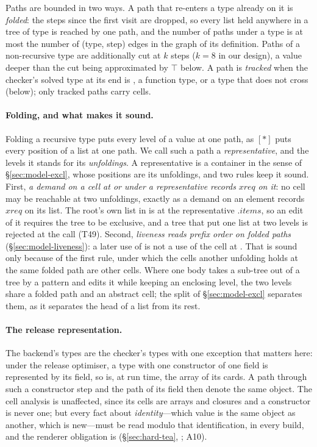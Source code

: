 Paths are bounded in two ways. A path that re-enters a type already on it is \emph{folded}: the steps
since the first visit are dropped, so every list held anywhere in a tree of type
 is reached by one path, and the number of paths under a type
is at most the number of (type, step) edges in the graph of its definition. Paths of a non-recursive
type are additionally cut at $k$ steps ($k = 8$ in our design), a value deeper than the cut being
approximated by $\top$ below. A path is \emph{tracked} when the checker's solved type at its end is
, a function type, or a type that does not cross (below); only tracked paths carry cells.

\paragraph{Folding, and what makes it sound.} Folding a recursive type puts every level of a value at one
path, as $[\ast]$ puts every position of a list at one path. We call such a path a \emph{representative},
and the levels it stands for its \emph{unfoldings}. A representative is a container in the sense of
\S\ref{sec:model-excl}, whose positions are its unfoldings, and two rules keep it sound. First, \emph{a
demand on a cell at or under a representative records} $\mathit{xreq}$ \emph{on it}: no cell may be
reachable at two unfoldings, exactly as a demand on an element records $\mathit{xreq}$ on its list. The
root's own list in  is at the
representative $.\mathit{items}$, so an edit of it requires the tree to be exclusive, and a tree that put
one list at two levels is rejected at the call (T49). Second, \emph{liveness reads prefix order on folded
paths} (\S\ref{sec:model-liveness}): a later use of  is not a use of the cell at
. That is sound only because of the first rule, under which the cells another unfolding
holds at the same folded path are other cells. Where one body takes a sub-tree out of a tree by a pattern
and edits it while keeping an enclosing level, the two levels share a folded path and an abstract cell;
the split of \S\ref{sec:model-excl} separates them, as it separates the head of a list from its rest.

\paragraph{The release representation.} The backend's types are the checker's types with one exception
that matters here: under the release optimiser, a type with one constructor of one field is represented
by its field, so  is, at run time, the array of its cards. A path through such a
constructor step and the path of its field then denote the same object. The cell analysis is unaffected,
since its cells are arrays and closures and a constructor is never one; but every fact about
\emph{identity}---which value is the same object as another, which is new---must be read modulo that
identification, in every build, and the renderer obligation is (\S\ref{sec:hard-tea}, ; A10).

